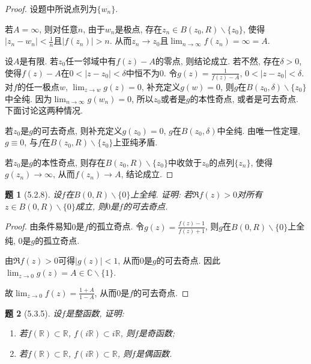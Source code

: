 \documentclass{article}[a4paper, 12pt]
\theoremstyle{mystyle}
\newtheorem{problem}{题}
\begin{document}
\begin{proof}
  设题中所说点列为\(\{w_n\}\).

  若\(A=\infty\), 则对任意\(n\), 由于\(w_n\)是极点, 存在\(z_n\in B(z_0,R)\backslash\{z_0\}\), 使得\(|z_n-w_n|<\frac1n\)且\(|f(z_n)|>n\). 从而\(z_n\to z_0\)且\(\lim_{n\to\infty}f(z_n)=\infty=A\).

  设\(A\)是有限. 若\(z_0\)任一邻域中有\(f(z)-A\)的零点, 则结论成立. 若不然, 存在\(\delta>0\), 使得\(f(z)-A\)在\(0<|z-z_0|<\delta\)中恒不为\(0\). 令\(g(z)=\frac{1}{f(z)-A}\), \(0<|z-z_0|<\delta\). 对\(f\)的任一极点\(w\), \(\lim_{z\to w}g(z)=0\), 补充定义\(g(w)=0\), 则\(g\)在\(B(z_0,\delta)\backslash\{z_0\}\)中全纯. 因为\(\lim_{n\to\infty}g(w_n)=0\), 所以\(z_0\)或者是\(g\)的本性奇点, 或者是可去奇点. 下面讨论这两种情况.

  若\(z_0\)是\(g\)的可去奇点, 则补充定义\(g(z_0)=0\), \(g\)在\(B(z_0,\delta)\)中全纯. 由唯一性定理, \(g\equiv0\), 与\(f\)在\(B(z_0,R)\backslash\{z_0\}\)上亚纯矛盾.

  若\(z_0\)是\(g\)的本性奇点, 则存在\(B(z_0,R)\backslash\{z_0\}\)中收敛于\(z_0\)的点列\(\{z_n\}\), 使得\(g(z_n)\to\infty\), 从而\(f(z_n)\to A\), 结论成立.
\end{proof}

\begin{problem}[5.2.8]
  设\(f\)在\(B(0,R)\backslash\{0\}\)上全纯. 证明: 若\(\Re f(z)>0\)对所有\(z\in B(0,R)\backslash\{0\}\)成立, 则\(0\)是\(f\)的可去奇点.
\end{problem}

\begin{proof}
  由条件易知\(0\)是\(f\)的孤立奇点. 令\(g(z)=\frac{f(z)-1}{f(z)+1}\), 则\(g\)在\(B(0,R)\backslash\{0\}\)上全纯, \(0\)是\(g\)的孤立奇点.

  由\(\Re f(z)>0\)可得\(|g(z)|<1\), 从而\(0\)是\(g\)的可去奇点. 因此\(\lim_{z\to0}g(z)=A\in\mathbb{C}\backslash\{1\}\). 

  故\(\lim_{z\to0}f(z)=\frac{1+A}{1-A}\), 从而\(0\)是\(f\)的可去奇点.
\end{proof}

\begin{problem}[5.3.5]
  设\(f\)是整函数, 证明:
  \begin{enumerate}
    \item 若\(f(\mathbb R)\subset \mathbb{R}\), \(f(i\mathbb R)\subset i\mathbb R\), 则\(f\)是奇函数;
    \item 若\(f(\mathbb R)\subset \mathbb R\), \(f(i\mathbb R)\subset \mathbb R\), 则\(f\)是偶函数.
  \end{enumerate}
\end{problem}
\end{document}
